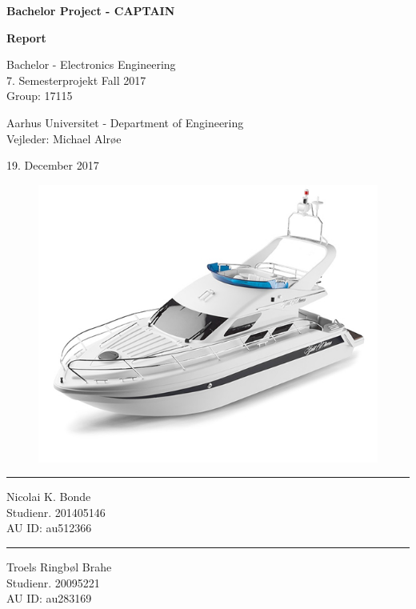 \begin{titlingpage}
		
	\begin{center}
			{\huge\bfseries Bachelor Project - CAPTAIN}\\
			\vspace{10pt}
			
			{\Huge\bfseries Report}\\
			
			\vspace{20pt}
			
			{Bachelor - Electronics Engineering}\\
			{\large 7. Semesterprojekt Fall 2017}\\
			{Group: 17115}
			
			\vspace{10pt}
			
			Aarhus Universitet - Department of Engineering\\
			Vejleder: Michael Alrøe
			\vspace{10pt}
			
			19. December 2017
			\vspace{10pt}
			\begin{figure}[H]
				\centering
				\includegraphics[max width=0.9\linewidth]{forside.png}
			\end{figure}
			\vspace{10pt}
			\begin{minipage}{0.25\linewidth}
				\centering
				\hrule
				\vspace{12pt}
				Nicolai K. Bonde\\
				Studienr. 201405146\\
				AU ID: au512366
			\end{minipage}
			\hspace{50pt}
			\begin{minipage}{0.25\linewidth}
				\centering
				\hrule
				\vspace{12pt}
				Troels Ringbøl Brahe\\
				Studienr. 20095221\\
				AU ID: au283169
			\end{minipage}
	\end{center}
\end{titlingpage}